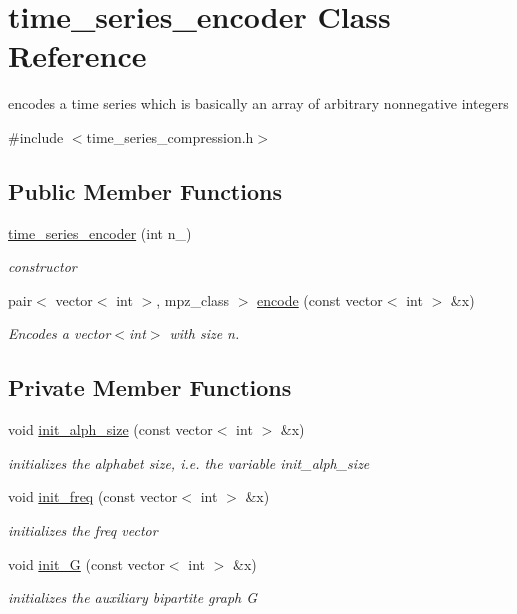 \hypertarget{classtime__series__encoder}{}\section{time\+\_\+series\+\_\+encoder Class Reference}
\label{classtime__series__encoder}


encodes a time series which is basically an array of arbitrary nonnegative integers  




{\ttfamily \#include $<$time\+\_\+series\+\_\+compression.\+h$>$}

\subsection*{Public Member Functions}
\begin{DoxyCompactItemize}
\item 
\hyperlink{classtime__series__encoder_addf67a97a877de0abe070a5c7d9fa3ec}{time\+\_\+series\+\_\+encoder} (int n\+\_\+)
\begin{DoxyCompactList}\small\item\em constructor \end{DoxyCompactList}\item 
pair$<$ vector$<$ int $>$, mpz\+\_\+class $>$ \hyperlink{classtime__series__encoder_a6d3fbf4d839978c6c82efc2160cdc465}{encode} (const vector$<$ int $>$ \&x)
\begin{DoxyCompactList}\small\item\em Encodes a {\ttfamily vector$<$int$>$} with size n. \end{DoxyCompactList}\end{DoxyCompactItemize}
\subsection*{Private Member Functions}
\begin{DoxyCompactItemize}
\item 
void \hyperlink{classtime__series__encoder_a8607e6953e5115a3c8a198266d2db8ce}{init\+\_\+alph\+\_\+size} (const vector$<$ int $>$ \&x)
\begin{DoxyCompactList}\small\item\em initializes the alphabet size, i.\+e. the variable init\+\_\+alph\+\_\+size \end{DoxyCompactList}\item 
void \hyperlink{classtime__series__encoder_af4b8988acb10fe076be59302e47084be}{init\+\_\+freq} (const vector$<$ int $>$ \&x)
\begin{DoxyCompactList}\small\item\em initializes the freq vector \end{DoxyCompactList}\item 
void \hyperlink{classtime__series__encoder_a90eb54134d6af2ab2cca36ee13956470}{init\+\_\+G} (const vector$<$ int $>$ \&x)
\begin{DoxyCompactList}\small\item\em initializes the auxiliary bipartite graph G \end{DoxyCompactList}\end{DoxyCompactItemize}

